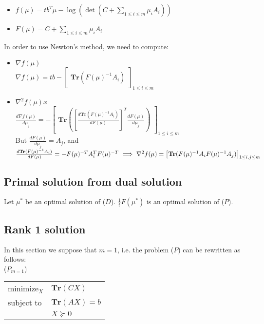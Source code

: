 \documentclass{article}
\begin{document}
\begin{itemize}
	\item $f(\mu) = t b^T \mu - \log(\det(C + \sum_{1 \leq i \leq m} \mu_i A_i))$
	\item $F(\mu) = C + \sum_{1 \leq i \leq m} \mu_i A_i$
\end{itemize}

In order to use Newton's method, we need to compute: \begin{itemize}
	\item $\nabla f(\mu)$ \\
	$\nabla f(\mu) = t b - \begin{bmatrix}
	\mathbf{Tr}(F(\mu)^{-1} A_i)
	\end{bmatrix}_{1 \leq i \leq m}$
	\item $\nabla^2 f(\mu)x$ \\
	$\frac{d \nabla f(\mu)}{d \mu_j} = - \begin{bmatrix}
	\mathbf{Tr}([\frac{d \mathbf{Tr}(F(\mu)^{-1} A_i)}{dF(\mu)}]^T \frac{d F(\mu)}{d \mu_j})
	\end{bmatrix}_{1 \leq i \leq m}$ \\
	But $\frac{d F(\mu)}{d \mu_j} = A_j$, and $\frac{d \mathbf{Tr}(F(\mu)^{-1} A_i)}{dF(\mu)} = - F(\mu)^{-T} A_i^T F(\mu)^{-T} \\
	\implies \nabla^2 f(\mu) = \begin{bmatrix}
	\mathbf{Tr}(F(\mu)^{-1} A_i F(\mu)^{-1} A_j)
	\end{bmatrix}_{1 \leq i, j \leq m}$
\end{itemize}

\subsection{Primal solution from dual solution}

Let $\mu^*$ be an optimal solution of ($D$). $\frac{1}{t} F(\mu^*)$ is an optimal solution of ($P$).

\subsection{Rank 1 solution}

In this section we suppose that $m = 1$, i.e. the problem ($P$) can be rewritten as follows: \\
($P_{m = 1}$)\begin{tabular}{l l}
	minimize$_{X}$ & $\mathbf{Tr}(C X)$ \\
	subject to & $\mathbf{Tr}(A X) = b$ \\
	& $X \succeq 0$  
\end{tabular}
\end{document}
